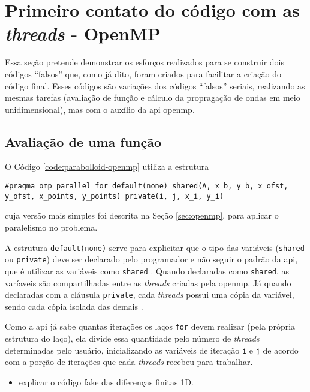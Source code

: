 \section{Primeiro contato do código com as \textit{threads} - OpenMP}

Essa seção pretende demonstrar os esforços realizados para se construir dois
códigos ``falsos'' que, como já dito, foram criados para facilitar a criação do código final.
Esses códigos são variações dos códigos ``falsos'' seriais, realizando as mesmas tarefas
(avaliação de função e cálculo da propragação de ondas em meio unidimensional), mas
com o auxílio da \gls{api} \acrshort{openmp}.

\subsection{Avaliação de uma função}

O Código \ref{code:parabolloid-openmp} utiliza a estrutura
\begin{lstlisting}
#pragma omp parallel for default(none) shared(A, x_b, y_b, x_ofst, y_ofst, x_points, y_points) private(i, j, x_i, y_i)
\end{lstlisting}
cuja versão mais simples foi descrita na Seção \ref{sec:openmp},  para aplicar o paralelismo no problema. 

A estrutura \texttt{default(none)} serve para explicitar que o tipo das variáveis (\texttt{shared} ou \texttt{private}) 
deve ser declarado pelo programador e não seguir o padrão da \acrshort{api}, que é utilizar as variáveis como \texttt{shared} 
\cite{unp:bosco-openmp-conceitos}. Quando declaradas como \texttt{shared}, as varíaveis são compartilhadas entre 
as \textit{\gls{threads}} criadas pela \acrshort{openmp}. Já quando declaradas com a cláusula \texttt{private}, cada \textit{\gls{threads}} 
possui uma cópia da variável, sendo cada cópia isolada das demais \cite{unp:bosco-openmp-conceitos}.

Como a \acrshort{api} já sabe quantas iterações os laços \texttt{for} devem realizar (pela própria estrutura do laço), 
ela divide essa quantidade pelo número de \textit{\gls{threads}} determinadas pelo usuário, inicializando as variáveis 
de iteração \texttt{i} e \texttt{j} de acordo com a porção de iterações que cada \textit{\gls{threads}} recebeu para 
trabalhar.

\begin{itemize}
	\item explicar o código fake das diferenças finitas 1D.
\end{itemize}